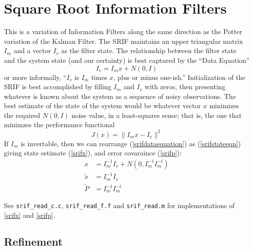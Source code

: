 \section{Square Root Information Filters}

This is a variation of Information Filters
along the same direction as
the Potter variation of the Kalman Filter.
The SRIF maintains an upper triangular matrix $I_m$
and a vector $I_v$ as the filter state.
The relationship between the filter state
and the system state (and our certainty)
is best captured by the ``Data Equation''
\begin{equation}
  I_v = I_m x + N(0,I)
\label{srifdataequation}
\end{equation}
or more informally,
``$I_v$ is $I_m$ times $x$,
plus or minus one-ish.''
Initialization of the SRIF
is best accomplished by
filling $I_m$ and $I_v$ with zeros,
then presenting whatever is known about the system
as a sequence of noisy observations.
The best estimate of the state of the system
would be whatever vector $x$
minimizes the required $N(0,I)$ noise value,
in a least-squares sense; that is, the one
that minimzes the performance functional
\begin{equation}
  J(x) = \lVert I_m x - I_v \rVert^2
\label{srifperf}
\end{equation}
If $I_m$ is invertable, then we can
rearrange (\ref{srifdataequation})
as (\ref{srifstateeqn})
giving state estimate (\ref{srifx}),
and error covaraince (\ref{srifp}):
\begin{subequations}
\begin{align}
  x & = I_m^{-1} I_v + N(0,I_m^{-1} I_m^{-t})
\label{srifstateeqn}
\\
  {\tilde x} & = I_m^{-1} I_v
\label{srifx}
\\
  {\tilde P} & = I_m^{-1}I_m^{-t}
\label{srifp}
\end{align}
\end{subequations}

See \verb|srif_read_c.c|, \verb|srif_read_f.f| and \verb|srif_read.m|
for implementations of \ref{srifx} and \ref{srifp}.

\newpage
\subsection{Refinement}

